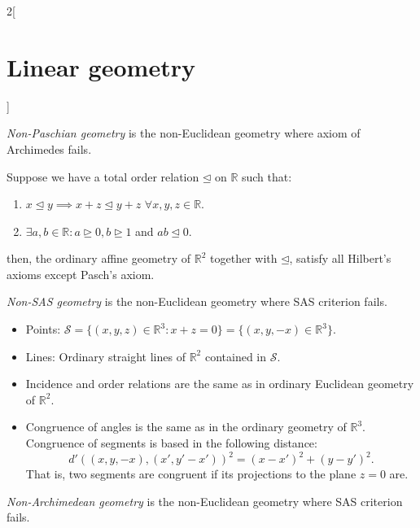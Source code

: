 \documentclass[class=article,10pt,crop=false]{standalone}
\begin{document}
\begin{multicols}{2}[\section{Linear geometry}]
\begin{definition}
\begin{itemize}
\begin{figure}[ht]
        \centering 
    \end{figure} 
\end{itemize}
\end{definition}
\begin{definition}
\textit{Non-Paschian geometry} is the non-Euclidean geometry where axiom of Archimedes fails.
\end{definition}
\begin{prop}
Suppose we have a total order relation $\unlhd$ on $\mathbb{R}$ such that:
\begin{enumerate}
    \item $x\unlhd y\implies x+z\unlhd y+z$ $\forall x,y,z\in\mathbb{R}$.
    \item $\exists a,b\in\mathbb{R}: a\unrhd 0, b\unrhd 1$ and $ab\unlhd 0$.
\end{enumerate}
then, the ordinary affine geometry of $\mathbb{R}^2$ together with $\unlhd$, satisfy all Hilbert's axioms except Pasch's axiom.
\end{prop}
\begin{definition}
\textit{Non-SAS geometry} is the non-Euclidean geometry where SAS criterion fails.
\end{definition}
\begin{prop}
\hfill
\begin{itemize}
    \item Points: $\mathcal{S}=\{(x,y,z)\in\mathbb{R}^3:x+z=0\}=\{(x,y,-x)\in\mathbb{R}^3\}$.
    \item Lines: Ordinary straight lines of $\mathbb{R}^2$ contained in $\mathcal{S}$.
    \item Incidence and order relations are the same as in ordinary Euclidean geometry of $\mathbb{R}^2$.
    \item Congruence of angles is the same as in the ordinary geometry of $\mathbb{R}^3$. Congruence of segments is based in the following distance:  $$d'((x,y,-x),(x',y'-x'))^2=(x-x')^2+(y-y')^2.$$ That is, two segments are congruent if its projections to the plane $z=0$ are.
\end{itemize}
\end{prop}
\begin{definition}
\textit{Non-Archimedean geometry} is the non-Euclidean geometry where SAS criterion fails.
\end{definition}

\end{multicols}
\end{document}
